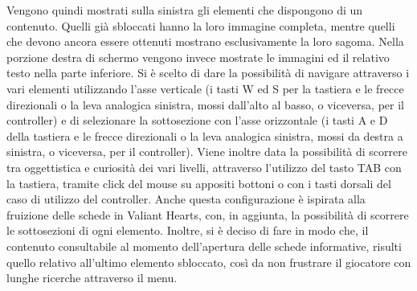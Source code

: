 Vengono quindi mostrati sulla sinistra gli elementi che dispongono di un contenuto. Quelli già sbloccati hanno la loro immagine completa, mentre quelli che devono ancora essere ottenuti mostrano esclusivamente la loro sagoma. Nella porzione destra di schermo vengono invece mostrate le immagini ed il relativo testo nella parte inferiore. Si è scelto di dare la possibilità di navigare attraverso i vari elementi utilizzando l’asse verticale (i tasti W ed S per la tastiera e le frecce direzionali o la leva analogica sinistra, mossi dall’alto al basso, o viceversa, per il controller) e di selezionare la sottosezione con l’asse orizzontale (i tasti A e D della tastiera e le frecce direzionali o la leva analogica sinistra, mossi da destra a sinistra, o viceversa, per il controller). Viene inoltre data la possibilità di scorrere tra oggettistica e curiosità dei vari livelli, attraverso l’utilizzo del tasto TAB con la tastiera, tramite click del mouse su appositi bottoni o con i tasti dorsali del caso di utilizzo del controller. Anche questa configurazione è ispirata alla fruizione delle schede in Valiant Hearts, con, in aggiunta, la possibilità di scorrere le sottosezioni di ogni elemento.
Inoltre, si è deciso di fare in modo che, il contenuto consultabile al momento dell’apertura delle schede informative, risulti quello relativo all’ultimo elemento sbloccato, così da non frustrare il giocatore con lunghe ricerche attraverso il menu.



